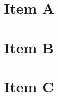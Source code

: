 \documentclass[12pt,titlepage]{article}
\begin{document}


\newpage
\doublespacing
\tableofcontents
\newpage
{}

\section{Item A}

\section{Item B}

\section{Item C}






%
%
\end{document}
